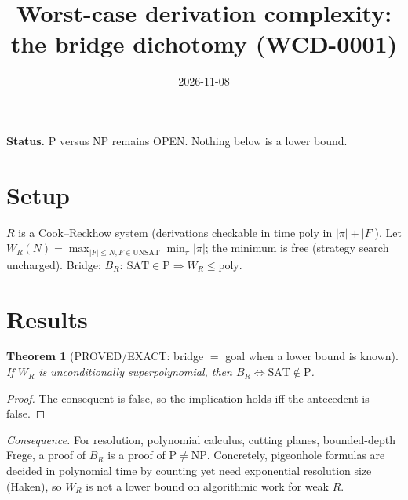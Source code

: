 \documentclass{article}
\title{Worst-case derivation complexity: the bridge dichotomy (WCD-0001)}
\date{2026-11-08}
\newtheorem{thm}{Theorem}\newtheorem{lem}{Lemma}
\begin{document}
\maketitle
\noindent\textbf{Status.} P versus NP remains OPEN. Nothing below is a lower bound.

\section*{Setup}
$R$ is a Cook--Reckhow system (derivations checkable in time $\mathrm{poly}$ in $|\pi|+|F|$). Let $W_R(N)=\max_{|F|\le N,F\in\mathrm{UNSAT}}\min_\pi |\pi|$; the minimum is free (strategy search uncharged). Bridge: $B_R:\ \mathrm{SAT}\in\mathrm P\Rightarrow W_R\le\mathrm{poly}$.

\section*{Results}
\begin{thm}[PROVED/EXACT: bridge $=$ goal when a lower bound is known]
If $W_R$ is unconditionally superpolynomial, then $B_R\iff \mathrm{SAT}\notin\mathrm P$.
\end{thm}
\begin{proof} The consequent is false, so the implication holds iff the antecedent is false. \end{proof}
\emph{Consequence.} For resolution, polynomial calculus, cutting planes, bounded-depth Frege, a proof of $B_R$ is a proof of $\mathrm P\ne\mathrm{NP}$. Concretely, pigeonhole formulas are decided in polynomial time by counting yet need exponential resolution size (Haken), so $W_R$ is not a lower bound on algorithmic work for weak $R$.
\end{document}
